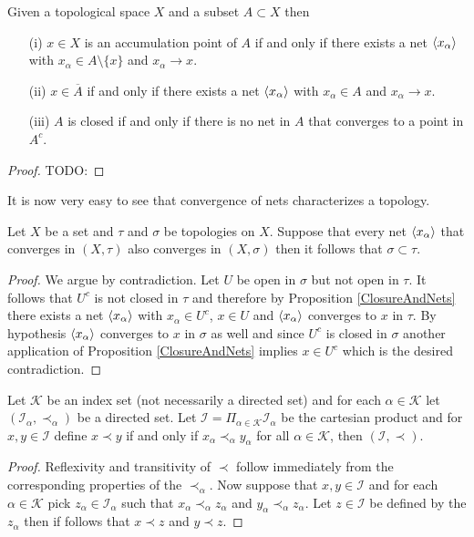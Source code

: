 \begin{prop}\label{ClosureAndNets}Given a topological space $X$ and a subset $A \subset X$ then
\begin{itemize}
\item[(i)] $x \in X$ is an accumulation point of $A$ if and only if there exists a net $\langle x_{\alpha} \rangle$ with $x_\alpha \in A \setminus \lbrace x \rbrace$ and $x_\alpha \to x$.
\item[(ii)] $x \in \overline{A}$ if and only if there exists a net $\langle x_{\alpha} \rangle$ with $x_\alpha \in A$ and $x_\alpha \to x$.
\item[(iii)] $A$ is closed if and only if there is no net in $A$ that converges to a point in $A^c$.
\end{itemize}
\end{prop}
\begin{proof}
TODO:
\end{proof}

It is now very easy to see that convergence of nets characterizes a topology.
\begin{cor}\label{UniquenessOfConvergenceClasses}Let $X$ be a set and $\tau$ and $\sigma$ be topologies on $X$.  Suppose that every net $\langle x_{\alpha} \rangle$ that converges in $(X,\tau)$ also converges in $(X,\sigma)$ then it follows that $\sigma \subset \tau$.
\end{cor}
\begin{proof}
We argue by contradiction.  Let $U$ be open in $\sigma$ but not open in $\tau$.  It follows that $U^c$ is not closed in $\tau$ and therefore by Proposition \ref{ClosureAndNets} there exists a 
net $\langle x_{\alpha} \rangle$ with $x_\alpha \in U^c$, $x \in U$ and $\langle x_{\alpha} \rangle$ converges to $x$ in $\tau$.  By hypothesis $\langle x_{\alpha} \rangle$ converges to $x$ in $\sigma$ as well and since $U^c$ is closed in $\sigma$ another application of Proposition \ref{ClosureAndNets} implies $x \in U^c$ which is the desired contradiction.
\end{proof}

\begin{prop}\label{DirectedSetProduct}Let $\mathcal{K}$ be an index  set (not necessarily a directed set) and for each $\alpha \in \mathcal{K}$ let $(\mathcal{I}_\alpha, \prec_\alpha)$ be a directed set.  Let $\mathcal{I} = \Pi_{\alpha \in \mathcal{K}} \mathcal{I}_\alpha$ be the cartesian product and for $x, y \in \mathcal{I}$ define $x \prec y$ if and only if $x_\alpha \prec_\alpha y_\alpha$ for all $\alpha \in \mathcal{K}$, then $(\mathcal{I}, \prec)$.
\end{prop}
\begin{proof}
Reflexivity and transitivity of $\prec$ follow immediately from the corresponding properties of the $\prec_\alpha$.  Now suppose that $x, y \in \mathcal{I}$ and for each $\alpha \in \mathcal{K}$ pick $z_\alpha \in \mathcal{I}_\alpha$ such that $x_\alpha \prec_\alpha z_\alpha$ and $y_\alpha \prec_\alpha z_\alpha$.  Let $z \in \mathcal{I}$ be defined by the $z_\alpha$ then if follows that $x \prec z$ and $y \prec z$.
\end{proof}


